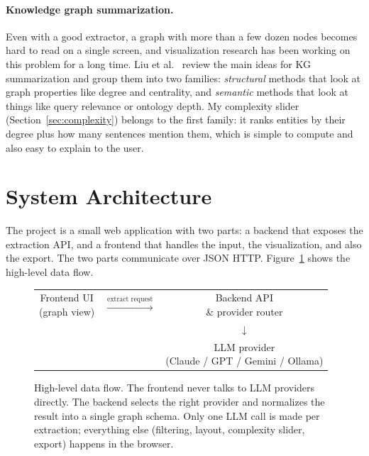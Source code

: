 \documentclass[11pt,a4paper]{article}
\begin{document}
\paragraph{Knowledge graph summarization.}
Even with a good extractor, a graph with more than a few dozen nodes becomes hard to read on a single screen, and visualization research has been working on this problem for a long time. Liu et al.~\cite{liu2016kgconstruction} review the main ideas for KG summarization and group them into two families: \emph{structural} methods that look at graph properties like degree and centrality, and \emph{semantic} methods that look at things like query relevance or ontology depth. My complexity slider (Section~\ref{sec:complexity}) belongs to the first family: it ranks entities by their degree plus how many sentences mention them, which is simple to compute and also easy to explain to the user.

\section{System Architecture}\label{sec:architecture}

The project is a small web application with two parts: a backend that exposes the extraction API, and a frontend that handles the input, the visualization, and also the export. The two parts communicate over JSON HTTP. Figure~\ref{fig:arch} shows the high-level data flow.

\begin{figure}[ht]
\centering
\begin{small}\ttfamily
\begin{tabular}{ccc}
\fbox{\parbox{3.2cm}{\centering Frontend UI\\(graph view)}} &
$\xrightarrow{\text{extract request}}$ &
\fbox{\parbox{3.2cm}{\centering Backend API\\\& provider router}} \\
& & $\downarrow$ \\
& & \fbox{\parbox{3.6cm}{\centering LLM provider\\(Claude / GPT / Gemini / Ollama)}}
\end{tabular}
\end{small}
\caption{High-level data flow. The frontend never talks to LLM providers directly. The backend selects the right provider and normalizes the result into a single graph schema. Only one LLM call is made per extraction; everything else (filtering, layout, complexity slider, export) happens in the browser.}
\label{fig:arch}
\end{figure}
\end{document}
